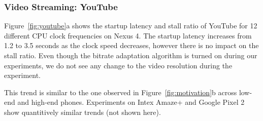 \subsubsection{Video Streaming: YouTube}

Figure~\ref{fig:youtube}a shows the startup latency and stall ratio of YouTube for 12 different CPU clock frequencies on Nexus 4. 
The startup latency increases from 1.2 to 3.5 seconds as the clock speed decreases, however 
there is no impact on the stall ratio. Even though the bitrate adaptation algorithm is turned on during our experiments, we do not see any change to the video resolution during the experiment.

This trend is similar to the one observed in Figure~\ref{fig:motivation}b across low-end and high-end phones. Experiments on Intex Amaze+ and Google Pixel 2 show quantitively similar trends (not shown here).




